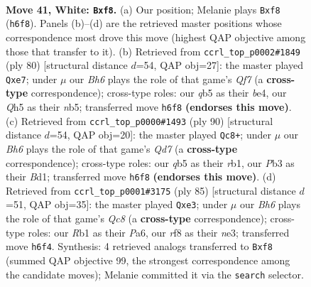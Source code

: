 \documentclass[11pt]{article}
\begin{document}
\clearpage

\begin{figure}[p]\centering
\begin{subfigure}{0.46\textwidth}\centering
\resizebox{\linewidth}{!}{%
\newchessgame
\chessboard[
  setfen={5r2/7n/5k1B/pqp4Q/8/1P6/P7/1R4K1 w - - 2 41},
  showmover=false,
  pgfstyle=straightmove, color=movearrow, markmove={h6-f8}
]}
\caption{}
\end{subfigure}\hfill
\begin{subfigure}{0.46\textwidth}\centering
\resizebox{\linewidth}{!}{%
\newchessgame
\chessboard[
  setfen={2q4k/4rQ2/7p/Pn2p3/3pb3/8/6PP/R6K w - - 0 41},
  showmover=false,
  pgfstyle=straightmove, color=movearrow, markmove={f7-e7}
]}
\caption{}
\end{subfigure}
\\[4pt]
\begin{subfigure}{0.46\textwidth}\centering
\resizebox{\linewidth}{!}{%
\newchessgame
\chessboard[
  setfen={7k/3Q4/2p4q/4p3/1B2P1P1/1p6/8/1r1B1K2 w - - 13 46},
  showmover=false,
  pgfstyle=straightmove, color=movearrow, markmove={d7-c8}
]}
\caption{}
\end{subfigure}\hfill
\begin{subfigure}{0.46\textwidth}\centering
\resizebox{\linewidth}{!}{%
\newchessgame
\chessboard[
  setfen={6k1/5p2/p5p1/P2Q4/8/4N1PP/6K1/2q5 b - - 0 43},
  showmover=false,
  pgfstyle=straightmove, color=movearrow, markmove={c1-e3}
]}
\caption{}
\end{subfigure}
\caption{\textbf{Move 41, White: \texttt{Bxf8}.} (a) Our position; Melanie plays \texttt{Bxf8} (\texttt{h6f8}). Panels (b)--(d) are the retrieved master positions whose correspondence most drove this move (highest QAP objective among those that transfer to it). (b) Retrieved from \texttt{ccrl\_top\_p0002\#1849} (ply 80) [structural distance $d$=54, QAP obj=27]: the master played \texttt{Qxe7}; under $\mu$ our \emph{Bh6} plays the role of that game's \emph{Qf7} (a \textbf{cross-type} correspondence); cross-type roles: our \emph{q}b5 as their \emph{b}e4, our \emph{Q}h5 as their \emph{n}b5; transferred move \texttt{h6f8} \textbf{(endorses this move)}. (c) Retrieved from \texttt{ccrl\_top\_p0000\#1493} (ply 90) [structural distance $d$=54, QAP obj=20]: the master played \texttt{Qc8+}; under $\mu$ our \emph{Bh6} plays the role of that game's \emph{Qd7} (a \textbf{cross-type} correspondence); cross-type roles: our \emph{q}b5 as their \emph{r}b1, our \emph{P}b3 as their \emph{B}d1; transferred move \texttt{h6f8} \textbf{(endorses this move)}. (d) Retrieved from \texttt{ccrl\_top\_p0001\#3175} (ply 85) [structural distance $d$=51, QAP obj=35]: the master played \texttt{Qxe3}; under $\mu$ our \emph{Bh6} plays the role of that game's \emph{Qc8} (a \textbf{cross-type} correspondence); cross-type roles: our \emph{R}b1 as their \emph{P}a6, our \emph{r}f8 as their \emph{n}e3; transferred move \texttt{h6f4}. Synthesis: 4 retrieved analogs transferred to \texttt{Bxf8} (summed QAP objective 99, the strongest correspondence among the candidate moves); Melanie committed it via the \texttt{search} selector.}
\label{fig:thought-m80}
\end{figure}
\end{document}
